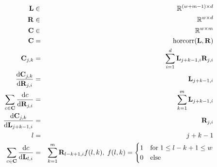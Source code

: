 \documentclass[varwidth=true, border=10pts]{standalone}
\begin{document}
\begin{eqnarray*}
    \mathbf{L} & \in & \mathbb{R}^{(w + m - 1) \times d} \\
    \mathbf{R} & \in & \mathbb{R}^{w \times d} \\
    \mathbf{C} & \in & \mathbb{R}^{w \times m} \\
    \mathbf{C} & = & \text{horcorr}(\mathbf{L}, \mathbf{R}) \\
    \mathbf{C}_{j, k} & = & \sum_{i = 1}^{d} \mathbf{L}_{j + k - 1, i} \mathbf{R}_{j,i} \\
    \dv{\mathbf{C}_{j, k}}{\mathbf{R}_{j,i}} & = & \mathbf{L}_{j + k - 1, i} \\
    \sum_{c \in \mathbf{C}} \dv{c}{\mathbf{R}_{j,i}} & = & \sum_{k = 1}^{m} \mathbf{L}_{j + k - 1, i} \\
    \dv{\mathbf{C}_{j, k}}{\mathbf{L}_{j + k - 1, i}} & = & \mathbf{R}_{j,i} \\
    l & = & j + k - 1 \\
    \sum_{c \in \mathbf{C}} \dv{c}{\mathbf{L}_{l, i}} & = & \sum_{k = 1}^{m}
        \mathbf{R}_{l - k + 1,i} f(l, k), \; f(l, k) = \begin{cases} 1 & \text{for} \; 1 \leq l - k + 1 \leq w\\
        0 & \text{else}
    \end{cases}
\end{eqnarray*}
\end{document}
